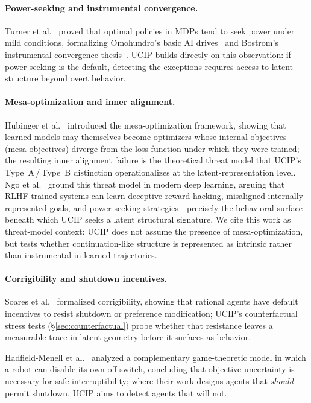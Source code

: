 \documentclass[11pt]{article}
\begin{document}
	\paragraph{Power-seeking and instrumental convergence.}
	Turner et al.~\cite{turner2021optimal} proved that optimal policies in MDPs
	tend to seek power under mild conditions, formalizing Omohundro's basic AI
	drives~\cite{omohundro2008basic} and Bostrom's instrumental convergence
	thesis~\cite{bostrom2014superintelligence}. UCIP builds directly on this
	observation: if power-seeking is the default, detecting the exceptions requires
	access to latent structure beyond overt behavior. 
	
	\paragraph{Mesa-optimization and inner alignment.}
	Hubinger et al.~\cite{Hubinger2019} introduced the mesa-optimization
	framework, showing that learned models may themselves become optimizers whose
	internal objectives (mesa-objectives) diverge from the loss function under which
	they were trained; the resulting inner alignment failure is the theoretical
	threat model that UCIP's Type~A\,/\,Type~B distinction operationalizes at the
	latent-representation level.
	Ngo et al.~\cite{Ngo2024} ground this threat model in modern deep
	learning, arguing that RLHF-trained systems can learn deceptive reward hacking,
	misaligned internally-represented goals, and power-seeking strategies---precisely
	the behavioral surface beneath which UCIP seeks a latent structural signature.
	We cite this work as threat-model context: UCIP does not assume the presence of
	mesa-optimization, but tests whether continuation-like structure is represented
	as intrinsic rather than instrumental in learned trajectories.
	
	\paragraph{Corrigibility and shutdown incentives.}
	Soares et al.~\cite{Soares2015} formalized corrigibility, showing
	that rational agents have default incentives to resist shutdown or preference
	modification; UCIP's counterfactual stress tests (\S\ref{sec:counterfactual})
	probe whether that resistance leaves a measurable trace in latent geometry
	before it surfaces as behavior.
	
	Hadfield-Menell et al.~\cite{HadfieldMenell2017} analyzed a
	complementary game-theoretic model in which a robot can disable its own
	off-switch, concluding that objective uncertainty is necessary for safe
	interruptibility; where their work designs agents that \emph{should} permit
	shutdown, UCIP aims to detect agents that will not.
	
\end{document}
